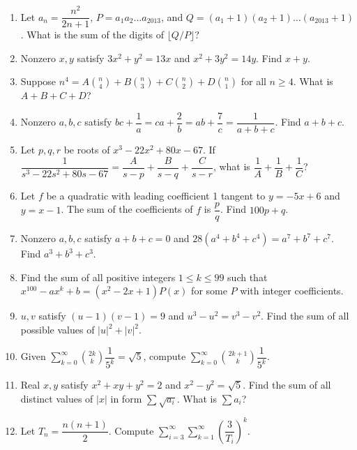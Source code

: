 \documentclass[12pt]{scrartcl}
\begin{document}
\begin{enumerate}
    \item Let $a_n = \dfrac{n^2}{2n+1}$, $P = a_1a_2\dots a_{2013}$, and $Q = (a_1+1)(a_2+1)\dots (a_{2013}+1)$. What is the sum of the digits of $\lfloor Q/P \rfloor$?

    \item Nonzero $x,y$ satisfy $3x^2+y^2=13x$ and $x^2+3y^2=14y$. Find $x+y$.

    \item Suppose $n^4 = A\binom{n}{4} + B\binom{n}{3} + C\binom{n}{2} + D\binom{n}{1}$ for all $n \ge 4$. What is $A+B+C+D$?

    \item Nonzero $a,b,c$ satisfy $bc + \dfrac{1}{a} = ca + \dfrac{2}{b} = ab + \dfrac{7}{c} = \dfrac{1}{a+b+c}$. Find $a+b+c$.

    \item Let $p, q, r$ be roots of $x^3-22x^2+80x-67$. If $\dfrac{1}{s^3-22s^2+80s-67} = \dfrac{A}{s-p} + \dfrac{B}{s-q} + \dfrac{C}{s-r}$, what is $\dfrac{1}{A}+\dfrac{1}{B}+\dfrac{1}{C}$?

    \item Let $f$ be a quadratic with leading coefficient 1 tangent to $y=-5x+6$ and $y=x-1$. The sum of the coefficients of $f$ is $\dfrac{p}{q}$. Find $100p+q$.

    \item Nonzero $a,b,c$ satisfy $a+b+c=0$ and $28(a^4+b^4+c^4) = a^7+b^7+c^7$. Find $a^3+b^3+c^3$.

    \item Find the sum of all positive integers $1 \le k \le 99$ such that $x^{100}-ax^k+b = (x^2-2x+1)P(x)$ for some $P$ with integer coefficients.

    \item $u,v$ satisfy $(u-1)(v-1)=9$ and $u^3-u^2=v^3-v^2$. Find the sum of all possible values of $|u|^2+|v|^2$.

    \item Given $\sum_{k=0}^{\infty} \binom{2k}{k} \dfrac{1}{5^k} = \sqrt{5}$, compute $\sum_{k=0}^{\infty} \binom{2k+1}{k} \dfrac{1}{5^k}$.

    \item Real $x,y$ satisfy $x^2+xy+y^2=2$ and $x^2-y^2=\sqrt{5}$. Find the sum of all distinct values of $|x|$ in form $\sum \sqrt{a_i}$. What is $\sum a_i$?

    \item Let $T_n = \dfrac{n(n+1)}{2}$. Compute $\sum_{i=3}^{\infty} \sum_{k=1}^{\infty} (\dfrac{3}{T_i})^k$.


\end{enumerate}
\end{document}
